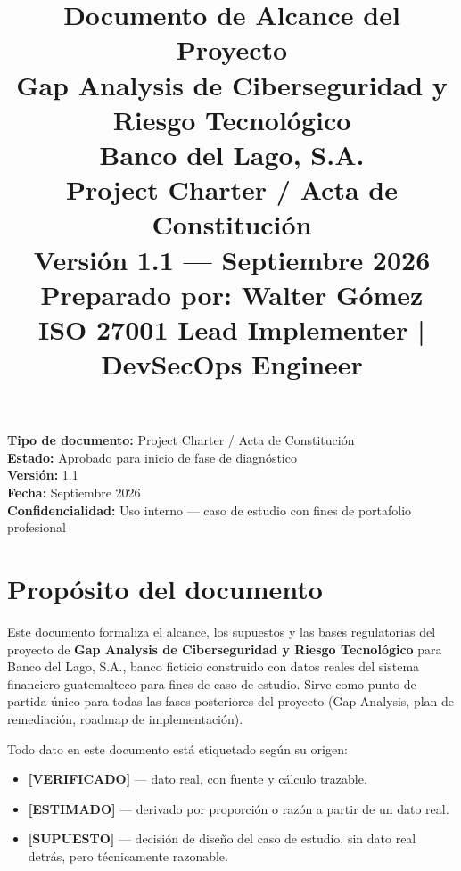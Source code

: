 \documentclass[11pt,a4paper]{article}
\title{
	\vspace{-1.5cm}
	\textbf{\Huge Documento de Alcance del Proyecto}\\[0.4cm]
	\Large Gap Analysis de Ciberseguridad y Riesgo Tecnológico\\[0.3cm]
	\large Banco del Lago, S.A.\\[0.5cm]
	\normalsize Project Charter / Acta de Constitución\\[0.3cm]
	\normalsize Versión 1.1 --- Septiembre 2026\\[0.5cm]
	\normalsize Preparado por: Walter Gómez\\
	\normalsize ISO 27001 Lead Implementer | DevSecOps Engineer
}
\date{}
\begin{document}
	
	\maketitle
	\thispagestyle{empty}
	
	\begin{infobox}
		\textbf{Tipo de documento:} Project Charter / Acta de Constitución \\
		\textbf{Estado:} Aprobado para inicio de fase de diagnóstico \\
		\textbf{Versión:} 1.1 \\
		\textbf{Fecha:} Septiembre 2026 \\
		\textbf{Confidencialidad:} Uso interno --- caso de estudio con fines de portafolio profesional
	\end{infobox}
	
	\vspace{0.5cm}
	
	\tableofcontents
	
	\newpage
	
	
	\section{Propósito del documento}
	
	Este documento formaliza el alcance, los supuestos y las bases regulatorias del proyecto de \textbf{Gap Analysis de Ciberseguridad y Riesgo Tecnológico} para Banco del Lago, S.A., banco ficticio construido con datos reales del sistema financiero guatemalteco para fines de caso de estudio. Sirve como punto de partida único para todas las fases posteriores del proyecto (Gap Analysis, plan de remediación, roadmap de implementación).
	
	Todo dato en este documento está etiquetado según su origen:
	
	\begin{itemize}[leftmargin=1.5em]
		\item \textbf{[VERIFICADO]} --- dato real, con fuente y cálculo trazable.
		\item \textbf{[ESTIMADO]} --- derivado por proporción o razón a partir de un dato real.
		\item \textbf{[SUPUESTO]} --- decisión de diseño del caso de estudio, sin dato real detrás, pero técnicamente razonable.
	\end{itemize}
	
\end{document}

